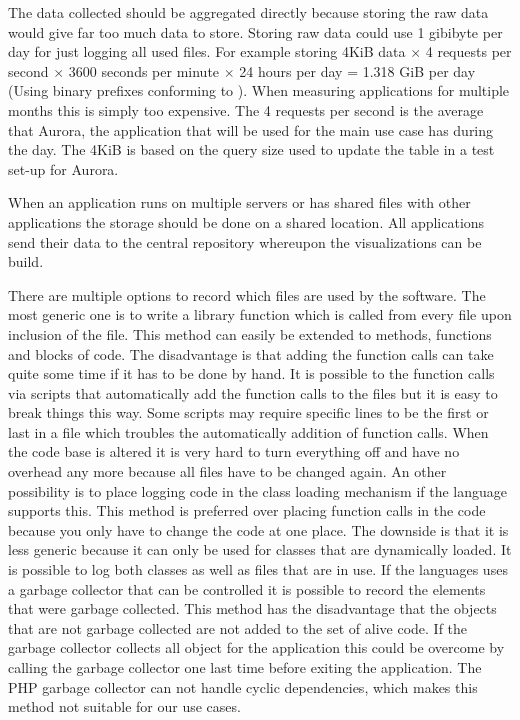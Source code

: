 The data collected should be aggregated directly because storing the raw data would give far too much data to store. Storing raw data could use 1 gibibyte per day for just logging all used files. For example storing 4KiB data $\times$ 4 requests per second $\times$ 3600 seconds per minute $\times$ 24 hours per day = 1.318 GiB per day (Using binary prefixes conforming to \cite{ieee1541}). When measuring applications for multiple months this is simply too expensive. The  4 requests per second is the average that Aurora, the application that will be used for the main use case has during the day. The 4KiB is based on the query size used to update the table in a test set-up for Aurora.

When an application runs on multiple servers or has shared files with other applications the storage should be done on a shared location. All applications send their data to the central repository whereupon the visualizations can be build. 

There are multiple options to record which files are used by the software. The most generic one is to write a library function which is called from every file upon inclusion of the file. This method can easily be extended to methods, functions and blocks of code. The disadvantage is that adding the function calls can take quite some time if it has to be done by hand. It is possible to the function calls via scripts that automatically add the function calls to the files but it is easy to break things this way. Some scripts may require specific lines to be the first or last in a file which troubles the automatically addition of function calls. When the code base is altered it is very hard to turn everything off and have no overhead any more because all files have to be changed again. An other possibility is to place logging code in the class loading mechanism if the language supports this. This method is preferred over placing function calls in the code because you only have to change the code at one place. The downside is that it is less generic because it can only be used for classes that are dynamically loaded. It is possible to log both classes as well as files that are in use. If the languages uses a garbage collector that can be controlled it is possible to record the elements that were garbage collected. This method has the disadvantage that the objects that are not garbage collected are not added to the set of alive code. If the garbage collector collects all object for the application this could be overcome by calling the garbage collector one last time before exiting the application. The PHP garbage collector can not handle cyclic dependencies\cite{php}, which makes this method not suitable for our use cases.

